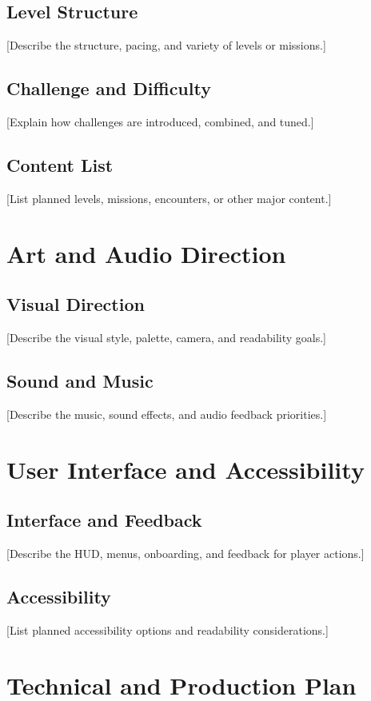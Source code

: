 \documentclass[11pt,a4paper]{article}
\begin{document}
\subsection{Level Structure}
[Describe the structure, pacing, and variety of levels or missions.]

\subsection{Challenge and Difficulty}
[Explain how challenges are introduced, combined, and tuned.]

\subsection{Content List}
[List planned levels, missions, encounters, or other major content.]

\section{Art and Audio Direction}
\subsection{Visual Direction}
[Describe the visual style, palette, camera, and readability goals.]

\subsection{Sound and Music}
[Describe the music, sound effects, and audio feedback priorities.]

\section{User Interface and Accessibility}
\subsection{Interface and Feedback}
[Describe the HUD, menus, onboarding, and feedback for player actions.]

\subsection{Accessibility}
[List planned accessibility options and readability considerations.]

\section{Technical and Production Plan}
\end{document}
